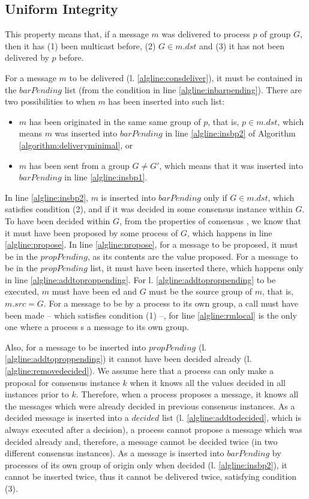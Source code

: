 \documentclass[times, 10pt]{article}
\begin{document}
\subsection{Uniform Integrity}

This property means that, if a message $m$ was delivered to process $p$ of group $G$, then it has (1) been multicast before, (2) $G \in m.dst$ and (3) it has not been delivered by $p$ before.

For a message $m$ to be delivered (l. \ref{algline:consdeliver}), it must be contained in the $barPending$ list (from the condition in line \ref{algline:inbarpending}).  There are two possibilities to when $m$ has been inserted into such list:
\begin{itemize}
  \item $m$ has been originated in the same same group of $p$, that is, $p \in m.dst$, which means $m$ was inserted into $barPending$ in line \ref{algline:insbp2} of Algorithm \ref{algorithm:deliveryminimal}, or
  \item $m$ has been sent from a group $G \neq G'$, which means that it was inserted into $barPending$ in line \ref{algline:insbp1}. 
\end{itemize}

In line \ref{algline:insbp2}, $m$ is inserted into $barPending$ only if $G \in m.dst$, which satisfies condition (2), and if it was decided in some consensus instance within $G$. To have been decided within $G$, from the properties of consensus \cite{lamport1998ptp}, we know that it must have been proposed by some process of $G$, which happens in line \ref{algline:propose}. In line \ref{algline:propose}, for a message to be proposed, it must be in the $propPending$, as its contents are the value proposed. For a message to be in the $propPending$ list, it must have been inserted there, which happens only in line \ref{algline:addtoproppending}. For l. \ref{algline:addtoproppending} to be executed, $m$ must have been \rmd{}ed and $G$ must be the source group of $m$, that is, $m.src = G$. For a message to be \rmc{} by a process to its own group, a  call must have been made -- which satisfies condition (1) --, for line \ref{algline:rmlocal} is the only one where a process \rmc{}s a message to its own group. 

Also, for a message to be inserted into $propPending$ (l. \ref{algline:addtoproppending}) it cannot have been decided already (l. \ref{algline:removedecided}). We assume here that a process can only make a proposal for consensus instance $k$ when it knows all the values decided in all instances prior to $k$. Therefore, when a process proposes a message, it knows all the messages which were already decided in previous consensus instances. As a decided message is inserted into a $decided$ list (l. \ref{algline:addtodecided}, which is always executed after a decision), a process cannot propose a message which was decided already and, therefore, a message cannot be decided twice (in two different consensus instances). As a message is inserted into $barPending$ by processes of its own group of origin only when decided (l. \ref{algline:insbp2}), it cannot be inserted twice, thus it cannot be delivered twice, satisfying condition (3).
\end{document}
